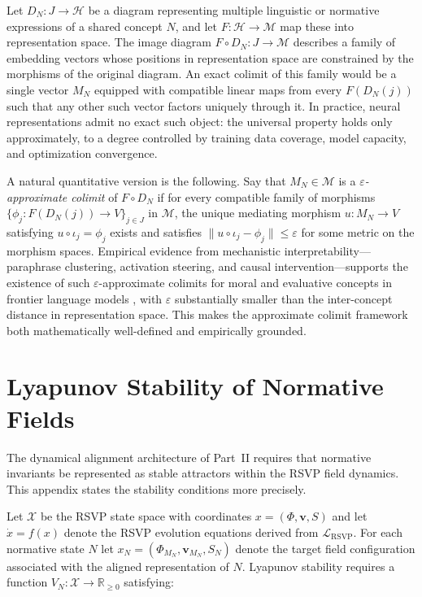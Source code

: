 \documentclass[12pt]{article}
\theoremstyle{definition}
\begin{document}
Let $D_N : J \to \mathcal{H}$ be a diagram representing multiple linguistic or
normative expressions of a shared concept $N$, and let $F : \mathcal{H} \to
\mathcal{M}$ map these into representation space. The image diagram $F \circ
D_N : J \to \mathcal{M}$ describes a family of embedding vectors whose
positions in representation space are constrained by the morphisms of the
original diagram. An exact colimit of this family would be a single vector
$M_N$ equipped with compatible linear maps from every $F(D_N(j))$ such that
any other such vector factors uniquely through it. In practice, neural
representations admit no exact such object: the universal property holds only
approximately, to a degree controlled by training data coverage, model capacity,
and optimization convergence.

A natural quantitative version is the following. Say that $M_N \in \mathcal{M}$
is a \emph{$\varepsilon$-approximate colimit} of $F \circ D_N$ if for every
compatible family of morphisms $\{\phi_j : F(D_N(j)) \to V\}_{j \in J}$ in
$\mathcal{M}$, the unique mediating morphism $u : M_N \to V$ satisfying
$u \circ \iota_j = \phi_j$ exists and satisfies $\| u \circ \iota_j - \phi_j
\| \leq \varepsilon$ for some metric on the morphism spaces. Empirical evidence
from mechanistic interpretability---paraphrase clustering, activation steering,
and causal intervention---supports the existence of such $\varepsilon$-approximate
colimits for moral and evaluative concepts in frontier language models
\citep{burns2022,elhage2022,nanda2023progress}, with $\varepsilon$ substantially
smaller than the inter-concept distance in representation space. This makes the
approximate colimit framework both mathematically well-defined and empirically
grounded.

\section{Lyapunov Stability of Normative Fields}
\label{app:lyapunov}

The dynamical alignment architecture of Part~II requires that normative
invariants be represented as stable attractors within the RSVP field dynamics.
This appendix states the stability conditions more precisely.

Let $\mathcal{X}$ be the RSVP state space with coordinates $x = (\Phi,
\mathbf{v}, S)$ and let $\dot{x} = f(x)$ denote the RSVP evolution equations
derived from $\mathcal{L}_{\mathrm{RSVP}}$. For each normative state $N$ let
$x_N = (\Phi_{M_N}, \mathbf{v}_{M_N}, S_N)$ denote the target field
configuration associated with the aligned representation of $N$. Lyapunov
stability requires a function $V_N : \mathcal{X} \to \mathbb{R}_{\geq 0}$
satisfying:
\end{document}
